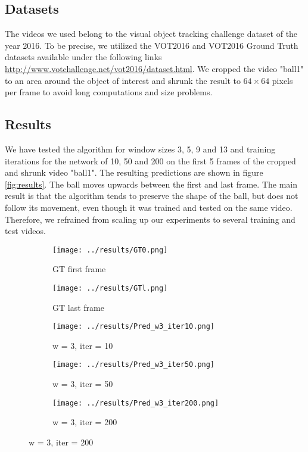 \documentclass{article}
\begin{document}
{\subsection{Datasets}
The videos we used belong to the visual object tracking challenge dataset of the year 2016. To be precise, we utilized the VOT2016 and VOT2016 Ground Truth datasets available under the following links \hyperlink{http://www.votchallenge.net/vot2016/dataset.html}{http://www.votchallenge.net/vot2016/dataset.html}. We cropped the video "ball1" to an area around the object of interest and shrunk the result to $64\times 64$ pixels per frame to avoid long computations and size problems.

\subsection{Results}\label{results_section}
We have tested the algorithm for window sizes 3, 5, 9 and 13 and training iterations for the network of 10, 50 and 200 on the first 5 frames of the cropped and shrunk video "ball1". The resulting predictions are shown in figure \ref{fig:results}. The ball moves upwards between the first and last frame. The main result is that the algorithm tends to preserve the shape of the ball, but does not follow its movement, even though it was trained and tested on the same video. Therefore, we refrained from scaling up our experiments to several training and test videos.
\begin{figure}[h]
    \centering
    
	\begin{subfigure}[b]{0.15\textwidth}
		\centering    
        \texttt{[image: ../results/GT0.png]}
        \caption{GT first frame}
    \end{subfigure}
    \begin{subfigure}[b]{0.15\textwidth}
        \centering
        \texttt{[image: ../results/GTl.png]}
        \caption{GT last frame}
    \end{subfigure}%
    
    \begin{subfigure}[t]{0.15\textwidth}
        \centering
        \texttt{[image: ../results/Pred\_w3\_iter10.png]}
        \caption{w = 3, iter = 10}
    \end{subfigure}
    \begin{subfigure}[t]{0.15\textwidth}
        \centering
        \texttt{[image: ../results/Pred\_w3\_iter50.png]}
        \caption{w = 3, iter = 50}
    \end{subfigure}
    \begin{subfigure}[t]{0.15\textwidth}
        \centering
        \texttt{[image: ../results/Pred\_w3\_iter200.png]}
        \caption{w = 3, iter = 200}
    \end{subfigure}
   

\end{figure}}
\end{document}
